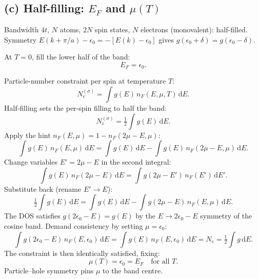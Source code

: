 \documentclass[11pt]{article}
\newcommand{\de}{\mathrm{d}}
\begin{document}
\begin{center}
\hspace{0.6cm}
\end{center}

\subsection*{(c) Half-filling: $E_F$ and $\mu(T)$}

Bandwidth $4t$, $N$ atoms, $2N$ spin states, $N$ electrons (monovalent): half-filled. Symmetry $E(k+\pi/a)-\epsilon_0 = -[E(k)-\epsilon_0]$ gives $g(\epsilon_0+\delta)=g(\epsilon_0-\delta)$.

At $T=0$, fill the lower half of the band:
\[
\boxed{\;E_F = \epsilon_0.\;}
\]

Particle-number constraint per spin at temperature $T$:
\[
N_e^{(\sigma)} = \int g(E)\,n_F(E,\mu,T)\,\de E.
\]
Half-filling sets the per-spin filling to half the band:
\[
N_e^{(\sigma)} = \tfrac12\int g(E)\,\de E.
\]
Apply the hint $n_F(E,\mu) = 1 - n_F(2\mu - E,\mu)$:
\[
\int g(E)\,n_F(E,\mu)\,\de E = \int g(E)\,\de E - \int g(E)\,n_F(2\mu - E,\mu)\,\de E.
\]
Change variables $E' = 2\mu - E$ in the second integral:
\[
\int g(E)\,n_F(2\mu-E)\,\de E = \int g(2\mu-E')\,n_F(E')\,\de E'.
\]
Substitute back (rename $E'\to E$):
\[
\tfrac12\int g(E)\,\de E = \int g(E)\,\de E - \int g(2\mu-E)\,n_F(E,\mu)\,\de E.
\]
The DOS satisfies $g(2\epsilon_0 - E) = g(E)$ by the $E\to 2\epsilon_0 - E$ symmetry of the cosine band. Demand consistency by setting $\mu = \epsilon_0$:
\[
\int g(2\epsilon_0-E)\,n_F(E,\epsilon_0)\,\de E = \int g(E)\,n_F(E,\epsilon_0)\,\de E = N_e = \tfrac12\int g\,\de E.
\]
The constraint is then identically satisfied, fixing:
\[
\boxed{\;\mu(T) = \epsilon_0 = E_F\quad\text{for all }T.\;}
\]
Particle--hole symmetry pins $\mu$ to the band centre.
\end{document}
